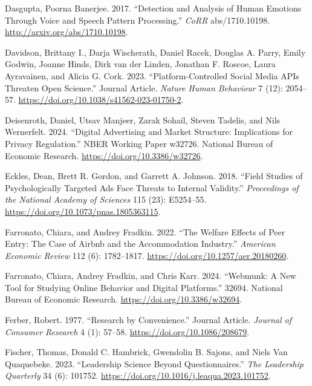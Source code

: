 \documentclass[
  a4paper,
]{scrreprt}
\newlength{\cslhangindent}
\newlength{\cslentryspacingunit} %
\newenvironment{CSLReferences}[2] %
 {%
  \setlength{\parindent}{0pt}
  \ifodd #1
  \let\oldpar\par
  \def\par{\hangindent=\cslhangindent\oldpar}
  \fi
  \setlength{\parskip}{#2\cslentryspacingunit}
 }%
 {}
\begin{document}
\begin{CSLReferences}{1}{0}
\leavevmode{}%
Dasgupta, Poorna Banerjee. 2017. {``Detection and Analysis of Human
Emotions Through Voice and Speech Pattern Processing.''} \emph{CoRR}
abs/1710.10198. \url{http://arxiv.org/abs/1710.10198}.

\leavevmode{}%
Davidson, Brittany I., Darja Wischerath, Daniel Racek, Douglas A. Parry,
Emily Godwin, Joanne Hinds, Dirk van der Linden, Jonathan F. Roscoe,
Laura Ayravainen, and Alicia G. Cork. 2023. {``Platform-Controlled
Social Media APIs Threaten Open Science.''} Journal Article.
\emph{Nature Human Behaviour} 7 (12): 2054--57.
\url{https://doi.org/10.1038/s41562-023-01750-2}.

\leavevmode{}%
Deisenroth, Daniel, Utsav Manjeer, Zarak Sohail, Steven Tadelis, and
Nils Wernerfelt. 2024. {``Digital Advertising and Market Structure:
Implications for Privacy Regulation.''} NBER Working Paper w32726.
National Bureau of Economic Research.
\url{https://doi.org/10.3386/w32726}.

\leavevmode{}%
Eckles, Dean, Brett R. Gordon, and Garrett A. Johnson. 2018. {``Field
Studies of Psychologically Targeted Ads Face Threats to Internal
Validity.''} \emph{Proceedings of the National Academy of Sciences} 115
(23): E5254--55. \url{https://doi.org/10.1073/pnas.1805363115}.

\leavevmode{}%
Farronato, Chiara, and Andrey Fradkin. 2022. {``The Welfare Effects of
Peer Entry: The Case of Airbnb and the Accommodation Industry.''}
\emph{American Economic Review} 112 (6): 1782--1817.
\url{https://doi.org/10.1257/aer.20180260}.

\leavevmode{}%
Farronato, Chiara, Andrey Fradkin, and Chris Karr. 2024. {``Webmunk: A
New Tool for Studying Online Behavior and Digital Platforms.''} 32694.
National Bureau of Economic Research.
\url{https://doi.org/10.3386/w32694}.

\leavevmode{}%
Ferber, Robert. 1977. {``Research by Convenience.''} Journal Article.
\emph{Journal of Consumer Research} 4 (1): 57--58.
\url{https://doi.org/10.1086/208679}.

\leavevmode{}%
Fischer, Thomas, Donald C. Hambrick, Gwendolin B. Sajons, and Niels Van
Quaquebeke. 2023. {``Leadership Science Beyond Questionnaires.''}
\emph{The Leadership Quarterly} 34 (6): 101752.
\url{https://doi.org/10.1016/j.leaqua.2023.101752}.


\end{CSLReferences}
\end{document}
